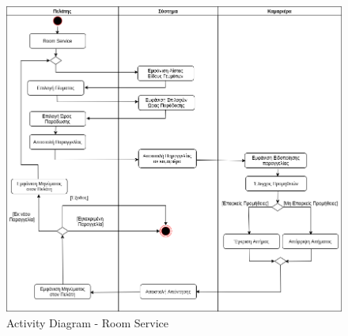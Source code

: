 \begin{figure}[H]
	\centering
	\includegraphics[width=1\textwidth]{Images/Activity-Room service}
	\caption{Activity Diagram - Room Service}
	\label{Activity - Room Service}
\end{figure}
\clearpage

